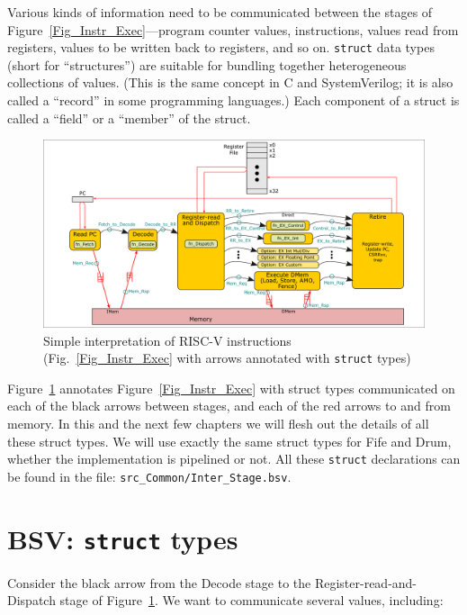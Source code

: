 Various kinds of information need to be communicated between the
stages of Figure~\ref{Fig_Instr_Exec}---program counter values,
instructions, values read from registers, values to be written back to
registers, and so on.  \verb|struct| data types (short for
``structures'') are suitable for bundling together heterogeneous
collections of values.  (This is the same concept in C and
SystemVerilog; it is also called a ``record'' in some programming
languages.)  Each component of a struct is called a ``field'' or a
``member'' of the struct.
\begin{figure}[htbp]
  \centerline{\includegraphics[width=6in,angle=0]{Figures/Fig_Instr_Exec_w_structs}}
  \caption{\label{Fig_Simple_Instr_Exec_w_structs}
           Simple interpretation of RISC-V instructions
	   (Fig.~\ref{Fig_Instr_Exec} with arrows annotated with {\tt struct} types)}
\end{figure}
Figure~\ref{Fig_Simple_Instr_Exec_w_structs} annotates
Figure~\ref{Fig_Instr_Exec} with struct types communicated on each of
the black arrows between stages, and each of the red arrows to and
from memory.  In this and the next few chapters we will flesh out the
details of all these struct types.  We will use exactly the same
struct types for Fife and Drum, {\ie} whether the implementation is
pipelined or not.  All these \verb|struct| declarations can be found
in the file: \verb|src_Common/Inter_Stage.bsv|.


\section{BSV: {\tt struct} types}

\label{BSV_struct_types}

Consider the black arrow from the Decode stage to the
Register-read-and-Dispatch stage of
Figure~\ref{Fig_Simple_Instr_Exec_w_structs}.  We want to communicate
several values, including:

